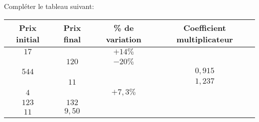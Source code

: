 \documentclass[a4paper]{article}
\renewcommand\euro{\officialeuro\xspace}
\begin{document}
  \begin{exercice}{}{}
  Compléter le tableau suivant:
  
  \begin{center}
    \begin{tabular}{|c|c|c|c|}
      \hline 
      \cellcolor{Blue!15!white}\textbf{Prix initial} & \cellcolor{Blue!15!white}\textbf{Prix final} & \cellcolor{Blue!15!white}\textbf{\% de variation} & \cellcolor{Blue!15!white}\textbf{Coefficient multiplicateur} \\
      \hline
      $17$\euro & & $+14\%$ & \\
      \hline
      & $120$\euro&  $-20\%$& \\
      \hline
      $544$\euro& & & $0,915$\\
      \hline
      & $11$\euro& & $1,237$\\
      \hline
      $4$\euro& & $+7,3\%$& \\
      \hline
      $123$\euro& $132$\euro & & \\
      \hline
      $11$\euro& $9,50$\euro& & \\
      \hline
    \end{tabular}
  \end{center}
      
  \end{exercice}
\end{document}
